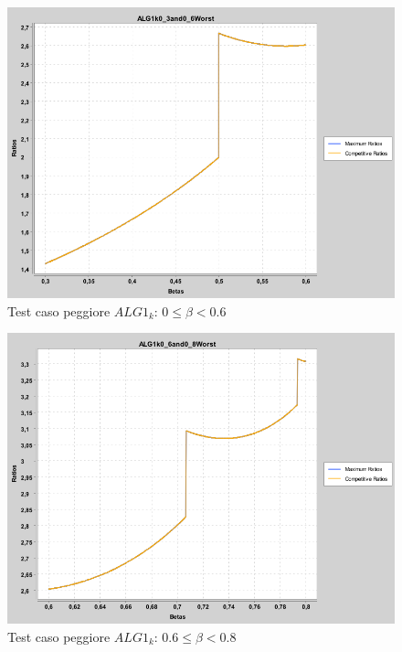 \documentclass[12pt]{article}
\begin{document}
\begin{figure}[H]
\caption{Test caso peggiore $ALG1_{k}$: $0 \leq \beta < 0.6$}
\centering
\includegraphics[scale=0.4]{max/ALG1k0_3and0_6Worst.png}
\end{figure}
\begin{figure}[H]
\caption{Test caso peggiore $ALG1_{k}$: $0.6 \leq \beta < 0.8$}
\centering
\includegraphics[scale=0.4]{max/ALG1k0_6and0_8Worst.png}
\end{figure}
\end{document}
